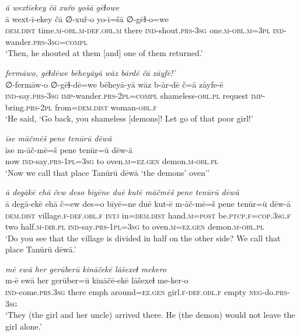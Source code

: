 \ea \label{ZP.68}
\textit{ā wextīekey čā xuřo yošā gēɫowe} \\ 
\gll ā wext-ī-ekey čā ∅-xuř-o yo-ī=šā ∅-gēɫ-o=we \\ 
 \textsc{dem.dist} time\textsc{.m}\textsc{-obl}\textsc{.m}\textsc{-def}\textsc{.obl}\textsc{.m} there \textsc{ind-}shout\textsc{.prs}\textsc{-3sg} one\textsc{.m}\textsc{-obl}\textsc{.m}\textsc{=3pl} \textsc{ind-}wander\textsc{.prs}\textsc{-3sg}\textsc{=compl} \\ 
\glt `Then, he shouted at them [and] one of them returned.'
\z 
 
\ea \label{ZP.70}
\textit{fermāwo, gēɫdēwe bēheyāyā wāz bārdē čā zāyfē!’} \\ 
\gll ∅-fermāw-o ∅-gēɫ-dē=we bēheyā-yā wāz b-ār-dē č=ā zāyfe-ē \\ 
 \textsc{ind-}say\textsc{.prs}\textsc{-3sg} \textsc{imp-}wander\textsc{.prs}-\textsc{2pl}\textsc{=compl} shameless\textsc{-obl}\textsc{.pl} request \textsc{imp-}bring\textsc{.prs}-\textsc{2pl} from=\textsc{dem.dist} woman\textsc{-obl}\textsc{.f} \\ 
\glt `He said, ‘Go back, you shameless [demons]! Let go of that poor girl!'
\z 
 
\ea \label{ZP.73}
\textit{īse māčmēš pene tenūrū dēwā} \\ 
\gll īse m-āč-mē=š pene tenūr=ū dēw-ā \\ 
 now \textsc{ind-}say\textsc{.prs}\textsc{-1pl}\textsc{=3sg} to oven\textsc{.m}\textsc{\textsc{=ez.gen}} demon\textsc{.m}\textsc{-obl}\textsc{.pl} \\ 
\glt `Now we call that place Tanūrū dēwā ‘the demons’ oven’'
\z 
 
\ea \label{ZP.74}
\textit{ā degākē ehā čew deso bīyēne duē kutē māčmēš pene tenūrū dēwā} \\ 
\gll ā degā-ekē ehā č=ew des=o bīyē=ne duē kut-ē m-āč-mē=š pene tenūr=ū dēw-ā \\ 
 \textsc{dem.dist} village\textsc{.f}\textsc{-def}\textsc{.obl}\textsc{.f} \textsc{intj} in=\textsc{dem.dist} hand\textsc{.m}\textsc{=\textsc{post}} be\textsc{.ptcp}\textsc{.f}\textsc{=cop}\textsc{.3sg}\textsc{.f} two half\textsc{.m}\textsc{-dir}\textsc{.pl} \textsc{ind-}say\textsc{.prs}\textsc{-1pl}\textsc{=3sg} to oven\textsc{.m}\textsc{\textsc{=ez.gen}} demon\textsc{.m}\textsc{-obl}\textsc{.pl} \\ 
\glt `Do you see that the village is divided in half on the other side? We call that place Tanūrū dēwā.'
\z 
 
\ea \label{ZP.75}
\textit{mē ewā her gerūberū kināčekē lāšexeɫ mekero} \\ 
\gll m-ē ewā her gerūber=ū kināčē-ekē lāšexeɫ me-ker-o \\ 
 \textsc{ind-}come\textsc{.prs}\textsc{.3sg} there emph around\textsc{\textsc{=ez.gen}} girl\textsc{.f}\textsc{-def}\textsc{.obl}\textsc{.f} empty \textsc{neg-}do\textsc{.prs}\textsc{-3sg} \\ 
\glt `They (the girl and her uncle) arrived there. He (the demon) would not leave the girl alone.'
\z 
 
